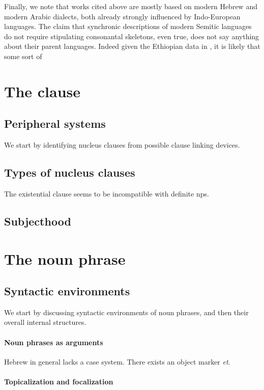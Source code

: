 \documentclass[a4paper, oneside, 12pt]{report}
\newcommand{\form}[1]{\emph{#1}}
\begin{document}
Finally, we note that works cited above are mostly based on modern Hebrew and modern Arabic dialects,
both already strongly influenced by Indo-European languages.
The claim that synchronic descriptions of modern Semitic languages
do not require stipulating consonantal skeletons,
even true, does not say anything about their parent languages.
Indeed given the Ethiopian data in \citet{rose2008formation},
it is likely that some sort of 

\section{The clause}

\subsection{Peripheral systems}

We start by identifying nucleus clauses from possible clause linking devices.


\subsection{Types of nucleus clauses}

The existential clause seems to be incompatible with definite \acp{np}.

\subsection{Subjecthood}


\section{The noun phrase}

\subsection{Syntactic environments}

We start by discussing syntactic environments of noun phrases,
and then their overall internal structures.

\paragraph*{Noun phrases as arguments}
Hebrew in general lacks a case system.
There exists an object marker \form{et}.

\paragraph*{Topicalization and focalization}
\end{document}
